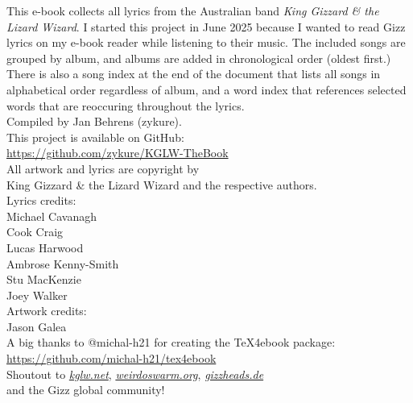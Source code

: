 \begin{center}
\vspace*{\fill}

This e-book collects all lyrics from the Australian band \emph{King Gizzard \& the Lizard Wizard}.
I started this project in June 2025 because I wanted to read Gizz lyrics on my e-book reader while listening to their music.
The included songs are grouped by album, and albums are added in chronological order (oldest first.)
There is also a song index at the end of the document that lists all songs in alphabetical order regardless of album,
and a word index that references selected words that are reoccuring throughout the lyrics.\\[5mm]

Compiled by Jan Behrens (zykure).\\[5mm]

This project is available on GitHub:\\
\url{https://github.com/zykure/KGLW-TheBook}\\[15mm]

All artwork and lyrics are copyright by \\
King Gizzard \& the Lizard Wizard and the respective authors.\\[10mm]

Lyrics credits:\\
Michael Cavanagh\\
Cook Craig\\
Lucas Harwood\\
Ambrose Kenny-Smith\\
Stu MacKenzie\\
Joey Walker\\[10mm]

Artwork credits:\\
Jason Galea\\[15mm]

A big thanks to @michal-h21 for creating the TeX4ebook package:\\
\url{https://github.com/michal-h21/tex4ebook}\\[5mm]

Shoutout to \href{https://kglw.net}{\textit{kglw.net}}, \href{https://weirdoswarm.org}{\textit{weirdoswarm.org}}, \href{https://gizzheads.de}{\textit{gizzheads.de}}\\
and the Gizz global community!\\

\vfill
\end{center}
